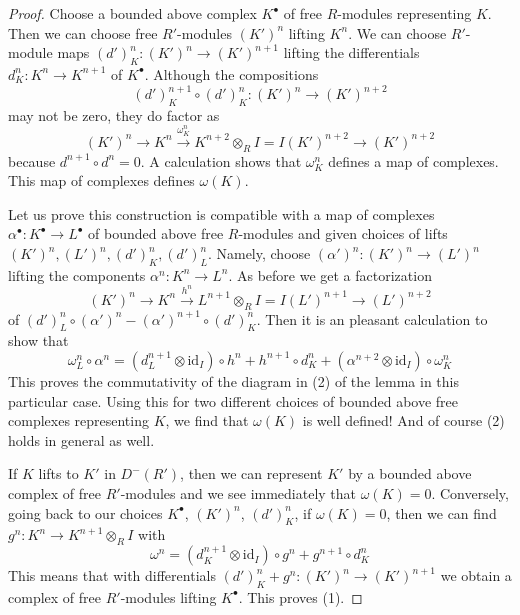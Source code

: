 \begin{proof}
Choose a bounded above complex $K^\bullet$ of free $R$-modules representing
$K$. Then we can choose free $R'$-modules $(K')^n$ lifting $K^n$.
We can choose $R'$-module maps $(d')^n_K : (K')^n \to (K')^{n + 1}$
lifting the differentials $d^n_K : K^n \to K^{n + 1}$ of $K^\bullet$.
Although the compositions
$$
(d')^{n + 1}_K \circ (d')^n_K : (K')^n \to (K')^{n + 2}
$$
may not be zero, they do factor as
$$
(K')^n \to K^n \xrightarrow{\omega^n_K}
K^{n + 2} \otimes_R I = I(K')^{n + 2} \to (K')^{n + 2}
$$
because $d^{n + 1} \circ d^n = 0$.
A calculation shows that $\omega^n_K$ defines a map of complexes.
This map of complexes defines $\omega(K)$.

\medskip\noindent
Let us prove this construction is compatible with a map of complexes
$\alpha^\bullet : K^\bullet \to L^\bullet$ of bounded above free $R$-modules
and given choices of lifts $(K')^n, (L')^n, (d')^n_K, (d')^n_L$.
Namely, choose $(\alpha')^n : (K')^n \to (L')^n$ lifting the
components $\alpha^n : K^n \to L^n$. As before we get a
factorization
$$
(K')^n \to K^n \xrightarrow{h^n}
L^{n + 1} \otimes_R I = I(L')^{n + 1} \to (L')^{n + 2}
$$
of $(d')^n_L \circ (\alpha')^n - (\alpha')^{n + 1} \circ (d')_K^n$.
Then it is an pleasant calculation to show that
$$
\omega^n_L \circ \alpha^n =
(d_L^{n + 1} \otimes \text{id}_I) \circ h^n + h^{n + 1} \circ d_K^n +
(\alpha^{n + 2} \otimes \text{id}_I) \circ \omega^n_K
$$
This proves the commutativity of the diagram in (2) of the lemma
in this particular case. Using this for two different choices
of bounded above free complexes representing $K$, we find that
$\omega(K)$ is well defined! And of course (2) holds in general as well.

\medskip\noindent
If $K$ lifts to $K'$ in $D^-(R')$, then we can represent
$K'$ by a bounded above complex of free $R'$-modules
and we see immediately that $\omega(K) = 0$.
Conversely, going back to our choices $K^\bullet$,
$(K')^n$, $(d')^n_K$, if $\omega(K) = 0$, then we can find
$g^n : K^n \to K^{n + 1} \otimes_R I$ with
$$
\omega^n = (d_K^{n + 1} \otimes \text{id}_I) \circ g^n +
g^{n + 1} \circ d_K^n
$$
This means that with differentials
$(d')^n_K + g^n : (K')^n \to (K')^{n + 1}$
we obtain a complex of free $R'$-modules lifting $K^\bullet$.
This proves (1).


\end{proof}
